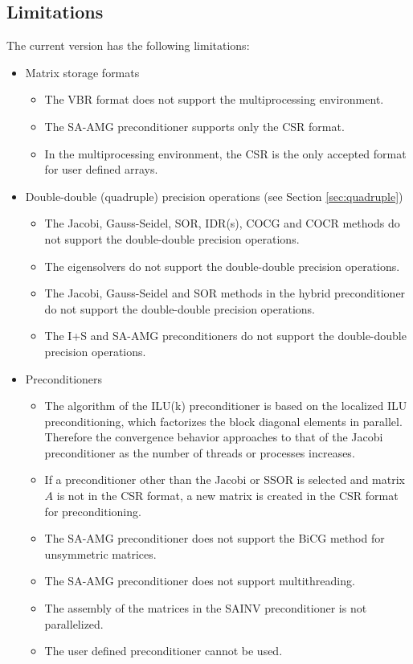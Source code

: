 \documentclass[a4paper]{article}
\begin{document}
\subsection{Limitations}
The current version has the following limitations:
\begin{itemize}

\item Matrix storage formats
\begin{itemize}
\item The VBR format does not support the multiprocessing environment.
\item The SA-AMG preconditioner supports only the CSR format. 
\item In the multiprocessing environment, the CSR is the only accepted
      format for user defined arrays.
\end{itemize}

\item Double-double (quadruple) precision operations (see Section \ref{sec:quadruple})
\begin{itemize}
\item The Jacobi, Gauss-Seidel, SOR, IDR(s), COCG and COCR methods
      do not support the double-double precision operations.
\item The eigensolvers do not support the double-double precision operations.
\item The Jacobi, Gauss-Seidel and SOR methods in the hybrid preconditioner do not support the double-double precision operations.
\item The I+S and SA-AMG preconditioners do not support the double-double precision operations.
\end{itemize}

\item Preconditioners
\begin{itemize}
\item The algorithm of the ILU(k) preconditioner is based on the localized ILU preconditioning\cite{nakajima}, which factorizes the block diagonal elements in parallel. Therefore the convergence behavior approaches to that of the Jacobi preconditioner as the number of threads or processes increases.
\item If a preconditioner other than the Jacobi or SSOR is selected 
      and matrix $A$ is not in the CSR format, a new matrix is created 
      in the CSR format for preconditioning.
\item The SA-AMG preconditioner does not support the BiCG method for unsymmetric matrices. 
\item The SA-AMG preconditioner does not support multithreading. 
\item The assembly of the matrices in the SAINV preconditioner is not parallelized.
\item The user defined preconditioner cannot be used.

\end{itemize}

\end{itemize}
\vspace*{5mm}
\end{document}
